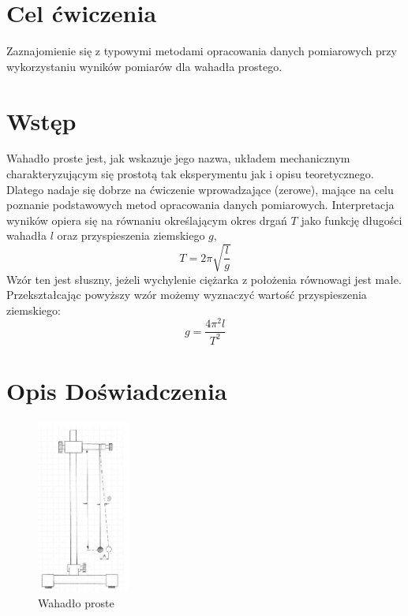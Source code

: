 \documentclass{fizraport}
\begin{document}
\maketitle

\section{Cel ćwiczenia}
Zaznajomienie się z typowymi metodami opracowania danych pomiarowych
przy wykorzystaniu wyników pomiarów dla wahadła prostego.

\section{Wstęp}
Wahadło proste jest, jak wskazuje jego nazwa, układem mechanicznym charakteryzującym się prostotą tak  eksperymentu  jak  i  opisu  teoretycznego.
Dlatego nadaje  się dobrze  na ćwiczenie  wprowadzające (zerowe),   mające   na   celu   poznanie   podstawowych   metod   opracowania danych   pomiarowych.
Interpretacja  wyników  opiera  się na  równaniu  określającym  okres  drgań $T$ jako  funkcję długości wahadła $l$ oraz przyspieszenia ziemskiego $g$, 
%
\[ T = 2\pi \sqrt{\frac{l}{g}} \]
%
Wzór ten jest słuszny, jeżeli wychylenie ciężarka z położenia równowagi jest małe.  
Przekształcając powyższy wzór możemy wyznaczyć wartość przyspieszenia ziemskiego:
%
\[ g = \frac{4\pi^2l}{T^2} \]

\section{Opis Doświadczenia}
\begin{figure}
 \centering
 \includegraphics[width=0.27\textwidth,keepaspectratio=true]{wahadlo1.png}
 \caption{Wahadło proste}
 \label{fig:w1}
\end{figure}
\end{document}

